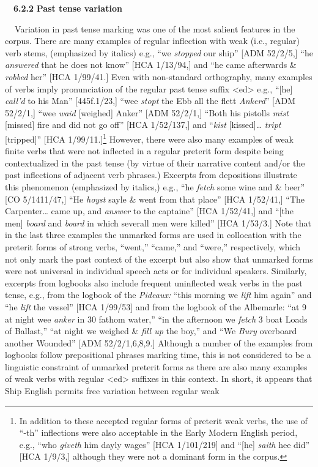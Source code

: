\begin{styleStandard}
\ \ \textbf{6.2.2} \textbf{Past tense variation }
\end{styleStandard}


\begin{styleStandard}
\textbf{\ \ }Variation in past tense marking was one of the most salient features in the corpus. There are many examples of regular inflection with weak (i.e., regular) verb stems, (emphasized by italics) e.g., “we \textit{stopped} our ship” [ADM 52/2/5,] “he \textit{answered} that he does not know” [HCA 1/13/94,] and “he came afterwards \&\textit{ robbed} her” [HCA 1/99/41.] Even with non-standard orthography, many examples of verbs imply pronunciation of the regular past tense suffix {\textless}ed{\textgreater} e.g., “[he] \textit{call’d} to his Man” [445f.1/23,] “wee \textit{stopt} the Ebb all the flett \textit{Ankerd}” [ADM 52/2/1,] “wee \textit{waid} [weighed] Anker” [ADM 52/2/1,] “Both his pistolls \textit{mist} [missed] fire and did not go off” [HCA 1/52/137,] and “\textit{kist} [kissed]… \textit{tript} [tripped]” [HCA 1/99/11.]\footnote{ In addition to these accepted regular forms of preterit weak verbs, the use of “-th” inflections were also acceptable in the Early Modern English period, e.g., “who \textit{giveth} him dayly wages” [HCA 1/101/219] and “[he] \textit{saith} hee did” [HCA 1/9/3,] although they were not a dominant form in the corpus.} However, there were also many examples of weak finite verbs that were not inflected in a regular preterit form despite being contextualized in the past tense (by virtue of their narrative content and/or the past inflections of adjacent verb phrases.) Excerpts from depositions illustrate this phenomenon (emphasized by italics,) e.g., “he \textit{fetch} some wine and \& beer” [CO 5/1411/47,] “He \textit{hoyst }sayle \& went from that place” [HCA 1/52/41,] “The Carpenter… came up, and \textit{answer} to the captaine” [HCA 1/52/41,] and “[the men] \textit{board} and\textit{ board} in which severall men were killed” [HCA 1/53/3.] Note that in the last three examples the unmarked forms are used in collocation with the preterit forms of strong verbs, “went,” “came,” and “were,” respectively, which not only mark the past context of the excerpt but also show that unmarked forms were not universal in individual speech acts or for individual speakers. Similarly, excerpts from logbooks also include frequent uninflected weak verbs in the past tense, e.g., from the logbook of the \textit{Pideaux: }“this morning we\textit{ lift} him again” and “he \textit{lift} the vessel” [HCA 1/99/53] and from the logbook of the Albemarle: “at 9 at night wee \textit{anker }in 30 fathom water,” “in the afternoon we \textit{fetch} 3 boat Loads of Ballast,” “at night we weighed \& \textit{fill up} the boy,” and “We\textit{ Bury} overboard another Wounded” [ADM 52/2/1,6,8,9.] Although a number of the examples from logbooks follow prepositional phrases marking time, this is not considered to be a linguistic constraint of unmarked preterit forms as there are also many examples of weak verbs with regular {\textless}ed{\textgreater} suffixes in this context. In short, it appears that Ship English permits free variation between regular weak 
\end{styleStandard}
